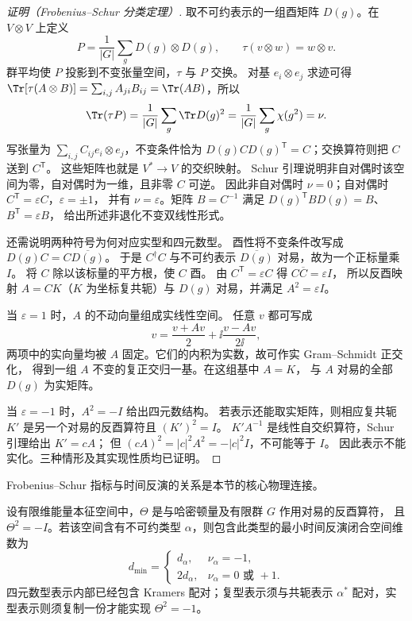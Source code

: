 \par\medskip
\begin{proof}[证明（Frobenius--Schur 分类定理）]
取不可约表示的一组酉矩阵 $D(g)$。在 $V\otimes V$ 上定义
\[
P=\frac1{|G|}\sum_gD(g)\otimes D(g),\qquad
\tau(v\otimes w)=w\otimes v.
\]
群平均使 $P$ 投影到不变张量空间，$\tau$ 与 $P$ 交换。
对基 $e_i\otimes e_j$ 求迹可得
$\Tr[\tau(A\otimes B)]=\sum_{i,j}A_{ji}B_{ij}=\Tr(AB)$，所以
\[
\Tr(\tau P)=\frac1{|G|}\sum_g\Tr D(g)^2
=\frac1{|G|}\sum_g\chi(g^2)=\nu.
\]
写张量为 $\sum_{i,j}C_{ij}e_i\otimes e_j$，不变条件恰为
$D(g)CD(g)^{\mathsf T}=C$；交换算符则把 $C$ 送到 $C^{\mathsf T}$。
这些矩阵也就是 $V^*\to V$ 的交织映射。
Schur 引理说明非自对偶时该空间为零，自对偶时为一维，且非零 $C$ 可逆。
因此非自对偶时 $\nu=0$；自对偶时 $C^{\mathsf T}=\varepsilon C$，$\varepsilon=\pm1$，
并有 $\nu=\varepsilon$。矩阵 $B=C^{-1}$ 满足
$D(g)^{\mathsf T}BD(g)=B$、$B^{\mathsf T}=\varepsilon B$，
给出所述非退化不变双线性形式。

还需说明两种符号为何对应实型和四元数型。
酉性将不变条件改写成 $D(g)C=C\overline{D(g)}$。
于是 $C^\dagger C$ 与不可约表示 $\overline{D(g)}$ 对易，故为一个正标量乘 $I$。
将 $C$ 除以该标量的平方根，使 $C$ 酉。
由 $C^{\mathsf T}=\varepsilon C$ 得 $C\overline C=\varepsilon I$，
所以反酉映射 $A=CK$（$K$ 为坐标复共轭）与 $D(g)$ 对易，并满足 $A^2=\varepsilon I$。

当 $\varepsilon=1$ 时，$A$ 的不动向量组成实线性空间。
任意 $v$ 都可写成
\[
v=\frac{v+Av}{2}+\ii\frac{v-Av}{2\ii},
\]
两项中的实向量均被 $A$ 固定。它们的内积为实数，故可作实 Gram--Schmidt 正交化，
得到一组 $A$ 不变的复正交归一基。在这组基中 $A=K$，
与 $A$ 对易的全部 $D(g)$ 为实矩阵。

当 $\varepsilon=-1$ 时，$A^2=-I$ 给出四元数结构。
若表示还能取实矩阵，则相应复共轭 $K'$ 是另一个对易的反酉算符且 $(K')^2=I$。
$K'A^{-1}$ 是线性自交织算符，Schur 引理给出 $K'=cA$；
但 $(cA)^2=|c|^2A^2=-|c|^2I$，不可能等于 $I$。
因此表示不能实化。三种情形及其实现性质均已证明。
\end{proof}\par\medskip

Frobenius--Schur 指标与时间反演的关系是本节的核心物理连接。

\begin{theorem}
设有限维能量本征空间中，$\Theta$ 是与哈密顿量及有限群 $G$ 作用对易的反酉算符，
且 $\Theta^2=-I$。若该空间含有不可约类型 $\alpha$，则包含此类型的最小时间反演闭合空间维数为
\[
d_{\min}=\begin{cases}
d_\alpha,&\nu_\alpha=-1,\\
2d_\alpha,&\nu_\alpha=0\text{ 或 }+1.
\end{cases}
\]
四元数型表示内部已经包含 Kramers 配对；复型表示须与共轭表示 $\alpha^*$ 配对，实型表示则须复制一份才能实现 $\Theta^2=-1$。
\label{thm:fs-time-reversal-degeneracy}
\end{theorem}

